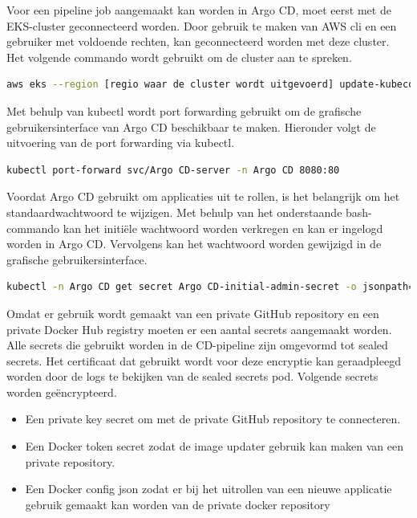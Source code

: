 Voor een pipeline job aangemaakt kan worden in Argo CD, moet eerst met de EKS-cluster geconnecteerd worden. Door gebruik te maken van AWS cli en een gebruiker met voldoende rechten, kan geconnecteerd worden met deze cluster. Het volgende commando wordt gebruikt om de cluster aan te spreken.
\newline

\begin{lstlisting}[language=bash, style=bashstyle]
aws eks --region [regio waar de cluster wordt uitgevoerd] update-kubeconfig --name [cluster naam] --profile [aws credentials profiel in .aws folder]
\end{lstlisting}

\vspace{0.5cm}
Met behulp van kubectl wordt port forwarding gebruikt om de grafische gebruikersinterface van Argo CD beschikbaar te maken. Hieronder volgt de uitvoering van de port forwarding via kubectl.
\newline

\begin{lstlisting}[language=bash, style=bashstyle]
  kubectl port-forward svc/Argo CD-server -n Argo CD 8080:80
\end{lstlisting}

\vspace{0.5cm}
Voordat Argo CD gebruikt om applicaties uit te rollen, is het belangrijk om het standaardwachtwoord te wijzigen. Met behulp van het onderstaande bash-commando kan het initiële wachtwoord worden verkregen en kan er ingelogd worden in Argo CD. Vervolgens kan het wachtwoord worden gewijzigd in de grafische gebruikersinterface.
\newline

\begin{lstlisting}[language=bash, style=bashstyle]
  kubectl -n Argo CD get secret Argo CD-initial-admin-secret -o jsonpath="{.data.password}" | base64 -d 
\end{lstlisting}

\vspace{0.5cm}
Omdat er gebruik wordt gemaakt van een private GitHub repository en een private Docker Hub registry moeten er een aantal secrets aangemaakt worden. Alle secrets die gebruikt worden in de CD-pipeline zijn omgevormd tot sealed secrets. Het certificaat dat gebruikt wordt voor deze encryptie kan geraadpleegd worden door de logs te bekijken van de sealed secrets pod. Volgende secrets worden geëncrypteerd.

\begin{itemize}
  \item Een private key secret om met de private GitHub repository te connecteren.
  \item Een Docker token secret zodat de image updater gebruik kan maken van een private repository.
  \item Een Docker config json zodat er bij het uitrollen van een nieuwe applicatie gebruik gemaakt kan worden van de private docker repository
\end{itemize}
\clearpage

